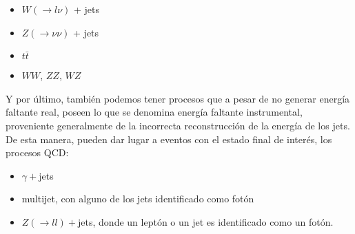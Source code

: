 \begin{itemize}
\item $W(\to l\nu)$ + jets
\item $Z(\to \nu\nu)$ + jets
\item $t\bar{t}$
\item $WW$, $ZZ$, $WZ$
\end{itemize}

Y por último, también podemos tener procesos que a pesar de no generar energía
faltante real, poseen lo que se denomina energía faltante instrumental,
proveniente generalmente de la incorrecta reconstrucción de la energía de los
jets. De esta manera, pueden dar lugar a eventos con el estado final de interés,
los procesos QCD:

\begin{itemize}
\item $\gamma+$jets
\item multijet, con alguno de los jets identificado como fotón
\item $Z(\to ll)+$jets, donde un leptón o un jet es identificado como un fotón.
\end{itemize}




